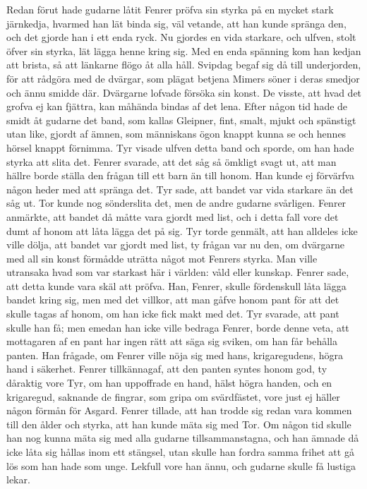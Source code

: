 Redan förut hade gudarne låtit Fenrer pröfva sin styrka på en mycket
stark järnkedja, hvarmed han lät binda sig, väl vetande, att han kunde
spränga den, och det gjorde han i ett enda ryck. Nu gjordes en vida
starkare, och ulfven, stolt öfver sin styrka, lät lägga henne kring sig.
Med en
\protect\hypertarget{lb1625905.xhtmlux5cux23start170}{}{}\protect\hypertarget{lb1625905.xhtmlux5cux23start170-a}{}{}\protect\hypertarget{lb1625905.xhtmlux5cux23start170-b}{}{}\protect\hypertarget{lb1625905.xhtmlux5cux23start170-c}{}{}\protect\hypertarget{lb1625905.xhtmlux5cux23start170-d}{}{}
enda spänning kom han kedjan att brista, så att länkarne flögo åt alla
håll. Svipdag begaf sig då till underjorden, för att rådgöra med de
dvärgar, som plägat betjena Mimers söner i deras smedjor och ännu smidde
där. Dvärgarne lofvade försöka sin konst. De visste, att hvad det grofva
ej kan fjättra, kan måhända bindas af det lena. Efter någon tid hade de
smidt åt gudarne det band, som kallas Gleipner, fint, smalt, mjukt och
spänstigt utan like, gjordt af ämnen, som människans ögon knappt kunna
se och hennes hörsel knappt förnimma. Tyr visade ulfven detta band och
sporde, om han hade styrka att slita det. Fenrer svarade, att det såg så
ömkligt svagt ut, att man hällre borde ställa den frågan till ett barn
än till honom. Han kunde ej förvärfva någon heder med att spränga det.
Tyr sade, att bandet var vida starkare än det såg ut. Tor kunde nog
sönderslita det, men de andre gudarne svårligen. Fenrer anmärkte, att
bandet då måtte vara gjordt med list, och i detta fall vore det dumt af
honom att låta lägga det på sig. Tyr torde genmält, att han alldeles
icke ville dölja, att bandet var gjordt med list, ty frågan var nu den,
om dvärgarne med all sin konst förmådde uträtta något mot Fenrers
styrka. Man ville utransaka hvad som var starkast här i världen: våld
eller kunskap. Fenrer sade, att detta kunde vara skäl att pröfva. Han,
Fenrer, skulle fördenskull låta lägga bandet kring sig, men med det
villkor, att man gåfve honom pant för att det skulle tagas af honom, om
han icke fick makt med det. Tyr svarade, att pant skulle han få; men
emedan han icke ville bedraga Fenrer, borde denne veta, att mottagaren
af en pant har ingen rätt att säga sig sviken, om han får behålla
panten. Han frågade, om Fenrer ville nöja sig med hans, krigaregudens,
högra hand i säkerhet. Fenrer tillkännagaf, att den panten syntes honom
god, ty dåraktig vore Tyr, om han uppoffrade en hand, hälst högra
handen, och en krigaregud, saknande de fingrar, som gripa om
svärdfästet, vore just ej häller någon förmån för Asgard. Fenrer
tillade, att han trodde sig redan vara kommen till den ålder och styrka,
att han kunde mäta sig med Tor.
\protect\hypertarget{lb1625905.xhtmlux5cux23start171}{}{}\protect\hypertarget{lb1625905.xhtmlux5cux23start171-a}{}{}\protect\hypertarget{lb1625905.xhtmlux5cux23start171-b}{}{}\protect\hypertarget{lb1625905.xhtmlux5cux23start171-c}{}{}\protect\hypertarget{lb1625905.xhtmlux5cux23start171-d}{}{}
Om någon tid skulle han nog kunna mäta sig med alla gudarne
tillsammanstagna, och han ämnade då icke låta sig hållas inom ett
stängsel, utan skulle han fordra samma frihet att gå lös som han hade
som unge. Lekfull vore han ännu, och gudarne skulle få lustiga lekar.

